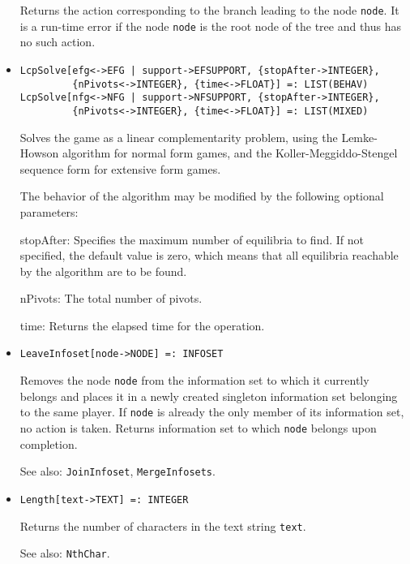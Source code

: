 \begin{itemize}
\bd
Returns the action corresponding to the branch leading to
the node \verb+node+.  It is a run-time error if the node \verb+node+ is
the root node of the tree and thus has no such action.
\ed

\item
\protect \large \begin{verbatim}
LcpSolve[efg<->EFG | support->EFSUPPORT, {stopAfter->INTEGER},
         {nPivots<->INTEGER}, {time<->FLOAT}] =: LIST(BEHAV)
LcpSolve[nfg<->NFG | support->NFSUPPORT, {stopAfter->INTEGER},
         {nPivots<->INTEGER}, {time<->FLOAT}] =: LIST(MIXED)
\end{verbatim}\normalsize

\bd
Solves the game as a linear complementarity problem, using the
Lemke-Howson algorithm for normal form games, and the
Koller-Meggiddo-Stengel sequence form for extensive form games.  

The behavior of the algorithm may be modified by the following
optional parameters:
\bd
\item
[stopAfter:] Specifies the maximum number of equilibria to find.  If
not specified, the default value is zero, which means that all
equilibria reachable by the algorithm are to be found.
\item
[nPivots:] The total number of pivots. 
\item
[time:] Returns the elapsed time for the operation.
\ed
\ed

\item
\protect \large \begin{verbatim}
LeaveInfoset[node->NODE] =: INFOSET
\end{verbatim}\normalsize

\bd
Removes the node \verb+node+ from the information set to
which it currently belongs and places it in a newly created
singleton information set belonging to the same player.  If \verb+node+
is already the only member of its information set, no action is taken.
Returns information set to which \verb+node+ belongs upon completion.
\item
[See also:] {\tt JoinInfoset}, {\tt MergeInfosets}.
\ed

\item
\protect \large \begin{verbatim}
Length[text->TEXT] =: INTEGER
\end{verbatim}\normalsize

\bd
Returns the number of characters in the text string
\verb+text+.
\item
[See also:] {\tt NthChar}.
\ed


\end{itemize}
